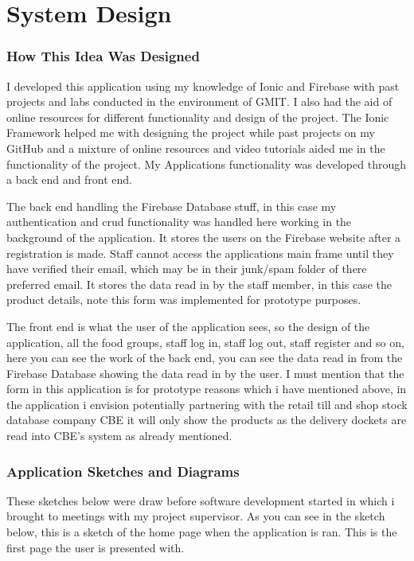 \chapter{System Design}

\subsection{How This Idea Was Designed}
I developed this application using my knowledge of Ionic and Firebase with past projects and labs conducted in the environment of GMIT. I also had the aid of online resources for different functionality and design of the project. The Ionic Framework helped me with designing the project while past projects on my GitHub and a mixture of online resources and video tutorials aided me in the functionality of the project. My Applications functionality was developed through a back end and front end. 
\newline

The back end handling the Firebase Database stuff, in this case my authentication and crud functionality was handled here working in the background of the application. It stores the users on the Firebase website after a registration is made. Staff cannot access the applications main frame until they have verified their email, which may be in their junk/spam folder of there preferred email. It stores the data read in by the staff member, in this case the product details, note this form was implemented for prototype purposes.
\newline 

The front end is what the user of the application sees, so the design of the application, all the food groups, staff log in, staff log out, staff register and so on, here you can see the work of the back end, you can see the data read in from the Firebase Database showing the data read in by the user. I must mention that the form in this application is for prototype reasons which i have mentioned above, in the application i envision potentially partnering with the retail till and shop stock database company CBE it will only show the products as the delivery dockets are read into CBE's system as already mentioned. 
\newpage
\subsection{Application Sketches and Diagrams}
These sketches below were draw before software development started in which i brought to meetings with my project supervisor. 
\newline
As you can see in the sketch below, this is a sketch of the home page when the application is ran. This is the first page the user is presented with.

